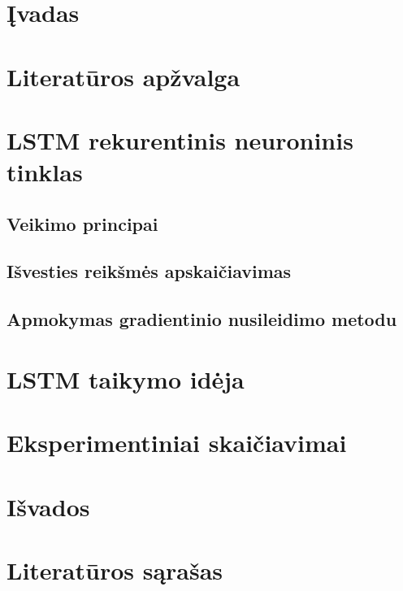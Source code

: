 \documentclass{ktu_phd_summary}
\begin{document}
\tableofcontents
\clearpage

\listoffigures
\clearpage

\listoftables
\clearpage

\section*{Įvadas}


\clearpage

\section{Literatūros apžvalga}


\clearpage



\section{LSTM rekurentinis neuroninis tinklas}


\subsection{Veikimo principai}


\subsection{Išvesties reikšmės apskaičiavimas}


\subsection{Apmokymas gradientinio nusileidimo metodu}


\clearpage

\section{LSTM taikymo idėja}


\clearpage

\section{Eksperimentiniai skaičiavimai}


\clearpage

\section{Išvados}


\section*{Literatūros sąrašas}

\begingroup
   \renewcommand{\section}[2]{}%
   
   
\endgroup
\end{document}
